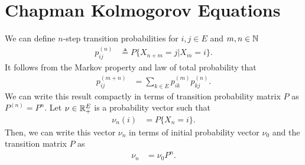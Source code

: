 \documentclass[a4paper,10pt,english]{article}
\begin{document}
\section{Chapman Kolmogorov Equations}
We can define $n$-step transition probabilities for $i,j \in E$ and $m,n \in \mathbb{N}$
\begin{align*}
p_{ij}^{(n)} &\triangleq P\{X_{n+m} = j | X_m = i\}. 
\end{align*}
It follows from the Markov property and law of total probability that 
\begin{align*} 
p_{ij}^{(m+n)} &= \sum_{k \in E} p_{ik}^{(m)}p_{kj}^{(n)}.
\end{align*}
We can write this result compactly in terms of transition probability matrix $P$ as $P^{(n)} = P^n$. 
Let $\nu \in \mathbb{R}_+^E$ is a probability vector such that 
\begin{align*}
\nu_n(i) &= P\{X_n = i\}.
\end{align*}
Then, we can write this vector $\nu_n$ in terms of initial probability vector $\nu_0$ and the transition matrix $P$ as 
\begin{align*}
\nu_n &= \nu_0P^n.
\end{align*}

 
\end{document}

